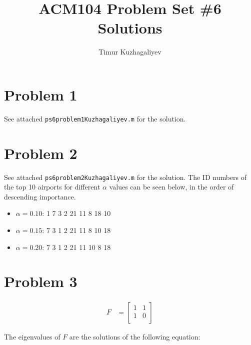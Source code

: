 \documentclass[10pt,letter]{article}
\begin{document}
\title{ACM104 Problem Set \#6 Solutions}

\author{Timur Kuzhagaliyev}

 
\maketitle 

\section*{Problem 1}
See attached \texttt{ps6problem1Kuzhagaliyev.m} for the solution.

\section*{Problem 2}
See attached \texttt{ps6problem2Kuzhagaliyev.m} for the solution. The ID numbers of the top 10 airports for different $\alpha$ values can be seen below, in the order of descending importance.

\begin{itemize}
\item{$\alpha = 0.10$}:   1  7  3  2  21  11  8  18  10  
\item{$\alpha = 0.15$}:   7  3  1  2  21  11  8  10  18
\item{$\alpha = 0.20$}:   7  3  1  2  21  11  10  8  18
\end{itemize}

\section*{Problem 3}
\begin{align*}
F &=
\left[ {\begin{array}{cc}
 1 & 1 \\
 1 & 0 \\
\end{array} } \right]
\end{align*}

The eigenvalues of $F$ are the solutions of the following equation:
\end{document}
